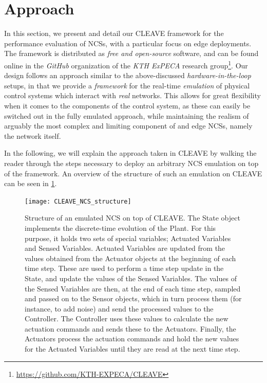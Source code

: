 \section{Approach}\label{sec:approach}

In this section, we present and detail our \ac{CLEAVE} framework for the performance evaluation of \acfp{NCS}, with a particular focus on edge deployments.
The framework is distributed as \emph{free and open-source} software, and can be found online in the \emph{GitHub} organization of the \emph{KTH ExPECA} research group\footnote{\url{https://github.com/KTH-EXPECA/CLEAVE}}.
Our design follows an approach similar to the above-discussed \emph{hardware-in-the-loop} setups, in that we provide a \emph{framework} for the real-time \emph{emulation} of physical control systems which interact with \emph{real} networks.
This allows for great flexibility when it comes to the components of the control system, as these can easily be switched out in the fully emulated approach, while maintaining the realism of arguably the most complex and limiting component of and edge \acp{NCS}, namely the network itself.

In the following, we will explain the approach taken in \ac{CLEAVE} by walking the reader through the steps necessary to deploy an arbitrary \ac{NCS} emulation on top of the framework.
An overview of the structure of such an emulation on \ac{CLEAVE} can be seen in \cref{fig:cleave:ncs:struct}.

\begin{figure}
    \centering
    \texttt{[image: CLEAVE\_NCS\_structure]}
    \caption{
        Structure of an emulated \ac{NCS} on top of CLEAVE.\@
        The State object implements the discrete-time evolution of the Plant.
        For this purpose, it holds two sets of special variables; Actuated Variables and Sensed Variables.
        Actuated Variables are updated from the values obtained from the Actuator objects at the beginning of each time step.
        These are used to perform a time step update in the State, and update the values of the Sensed Variables.
        The values of the Sensed Variables are then, at the end of each time step, sampled and passed on to the Sensor objects, which in turn process them (for instance, to add noise) and send the processed values to the Controller.
        The Controller uses these values to calculate the new actuation commands and sends these to the Actuators.
        Finally, the Actuators process the actuation commands and hold the new values for the Actuated Variables until they are read at the next time step.
    }\label{fig:cleave:ncs:struct}
\end{figure}

